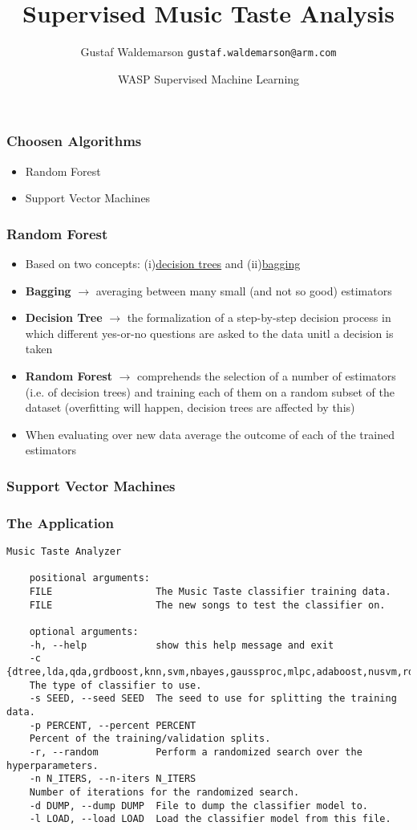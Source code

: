 \documentclass{beamer}
\title{Supervised Music Taste Analysis}
\date{WASP Supervised Machine Learning}
\author[Gustaf]{Gustaf Waldemarson \texttt{gustaf.waldemarson@arm.com}}
\begin{document}
\begin{frame}
  \titlepage
\end{frame}


\begin{frame}
  \frametitle{Choosen Algorithms}
  \begin{itemize}
  \item Random Forest
  \item Support Vector Machines
  \end{itemize}
\end{frame}

\begin{frame}
  \frametitle{Random Forest}
\begin{itemize}
\item Based on two concepts: (i)\underline{decision trees} and (ii)\underline{bagging}
\item \textbf{Bagging} $\rightarrow$ averaging between many small (and not so good) estimators
\item \textbf{Decision Tree} $\rightarrow$ the formalization of a step-by-step decision process in which different yes-or-no questions are asked to the data unitl a decision is taken
\item \textbf{Random Forest} $\rightarrow$ comprehends the selection of a number of estimators (i.e. of decision trees) and training each of them on a random subset of the dataset (overfitting will happen, decision trees are affected by this)
\item When evaluating over new data average the outcome of each of the trained estimators
\end{itemize}
\end{frame}


\begin{frame}
  \frametitle{Support Vector Machines}

\end{frame}


\begin{frame}[fragile]
  \frametitle{The Application}

\begin{Verbatim}[fontsize=\footnotesize]
    Music Taste Analyzer

    positional arguments:
    FILE                  The Music Taste classifier training data.
    FILE                  The new songs to test the classifier on.

    optional arguments:
    -h, --help            show this help message and exit
    -c {dtree,lda,qda,grdboost,knn,svm,nbayes,gaussproc,mlpc,adaboost,nusvm,rdforest},
    The type of classifier to use.
    -s SEED, --seed SEED  The seed to use for splitting the training data.
    -p PERCENT, --percent PERCENT
    Percent of the training/validation splits.
    -r, --random          Perform a randomized search over the hyperparameters.
    -n N_ITERS, --n-iters N_ITERS
    Number of iterations for the randomized search.
    -d DUMP, --dump DUMP  File to dump the classifier model to.
    -l LOAD, --load LOAD  Load the classifier model from this file.
\end{Verbatim}

\end{frame}
\end{document}
